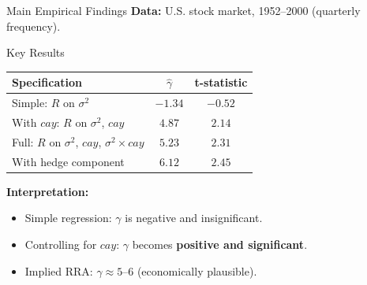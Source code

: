 \documentclass{beamer}
\begin{document}
\begin{frame}{Main Empirical Findings}
    \textbf{Data:} U.S. stock market, 1952--2000 (quarterly frequency).
    
    \begin{block}{Key Results}
        \begin{table}[h]
            \centering
            \footnotesize
            \begin{tabular}{lcc}
                \hline
                \textbf{Specification} & $\hat{\gamma}$ & \textbf{t-statistic} \\
                \hline
                Simple: $R$ on $\sigma^2$ & $-1.34$ & $-0.52$ \\
                With $cay$: $R$ on $\sigma^2$, $cay$ & $4.87$ & $2.14$ \\
                Full: $R$ on $\sigma^2$, $cay$, $\sigma^2 \times cay$ & $5.23$ & $2.31$ \\
                With hedge component & $6.12$ & $2.45$ \\
                \hline
            \end{tabular}
        \end{table}
    \end{block}
    
    \textbf{Interpretation:}
    \begin{itemize}
        \item Simple regression: $\gamma$ is negative and insignificant.
        \item Controlling for $cay$: $\gamma$ becomes \textbf{positive and significant}.
        \item Implied RRA: $\gamma \approx 5$--$6$ (economically plausible).
    \end{itemize}
\end{frame}
\end{document}
